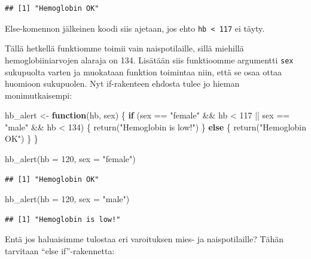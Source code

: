 \documentclass[
]{book}
\newenvironment{Shaded}{\begin{snugshade}}{\end{snugshade}}
\newcommand{\AttributeTok}[1]{\textcolor[rgb]{0.77,0.63,0.00}{#1}}
\newcommand{\ControlFlowTok}[1]{\textcolor[rgb]{0.13,0.29,0.53}{\textbf{#1}}}
\newcommand{\DecValTok}[1]{\textcolor[rgb]{0.00,0.00,0.81}{#1}}
\newcommand{\FunctionTok}[1]{\textcolor[rgb]{0.00,0.00,0.00}{#1}}
\newcommand{\NormalTok}[1]{#1}
\newcommand{\OtherTok}[1]{\textcolor[rgb]{0.56,0.35,0.01}{#1}}
\newcommand{\SpecialCharTok}[1]{\textcolor[rgb]{0.00,0.00,0.00}{#1}}
\newcommand{\StringTok}[1]{\textcolor[rgb]{0.31,0.60,0.02}{#1}}
\begin{document}
\begin{verbatim}
## [1] "Hemoglobin OK"
\end{verbatim}

Else-komennon jälkeinen koodi siis ajetaan, jos ehto \texttt{hb\ \textless{}\ 117} ei täyty.

Tällä hetkellä funktiomme toimii vain naispotilaille, sillä miehillä hemoglobiiniarvojen alaraja on 134. Lisätään siis funktioomme argumentti \texttt{sex} sukupuolta varten ja muokataan funktion toimintaa niin, että se osaa ottaa huomioon sukupuolen. Nyt if-rakenteen ehdosta tulee jo hieman monimutkaisempi:

\begin{Shaded}
\begin{Highlighting}[]
\NormalTok{hb\_alert }\OtherTok{\textless{}{-}} \ControlFlowTok{function}\NormalTok{(hb, sex) \{}
  \ControlFlowTok{if}\NormalTok{ (sex }\SpecialCharTok{==} \StringTok{"female"} \SpecialCharTok{\&\&}\NormalTok{ hb }\SpecialCharTok{\textless{}} \DecValTok{117} \SpecialCharTok{||}\NormalTok{ sex }\SpecialCharTok{==} \StringTok{"male"} \SpecialCharTok{\&\&}\NormalTok{ hb }\SpecialCharTok{\textless{}} \DecValTok{134}\NormalTok{) \{}
    \FunctionTok{return}\NormalTok{(}\StringTok{"Hemoglobin is low!"}\NormalTok{)}
\NormalTok{  \} }\ControlFlowTok{else}\NormalTok{ \{}
    \FunctionTok{return}\NormalTok{(}\StringTok{"Hemoglobin OK"}\NormalTok{)}
\NormalTok{  \}}
\NormalTok{\}}

\FunctionTok{hb\_alert}\NormalTok{(}\AttributeTok{hb =} \DecValTok{120}\NormalTok{, }\AttributeTok{sex =} \StringTok{"female"}\NormalTok{)}
\end{Highlighting}
\end{Shaded}

\begin{verbatim}
## [1] "Hemoglobin OK"
\end{verbatim}

\begin{Shaded}
\begin{Highlighting}[]
\FunctionTok{hb\_alert}\NormalTok{(}\AttributeTok{hb =} \DecValTok{120}\NormalTok{, }\AttributeTok{sex =} \StringTok{"male"}\NormalTok{)}
\end{Highlighting}
\end{Shaded}

\begin{verbatim}
## [1] "Hemoglobin is low!"
\end{verbatim}

Entä jos haluaisimme tulostaa eri varoituksen mies- ja naispotilaille? Tähän tarvitaan ``else if''-rakennetta:
\end{document}
